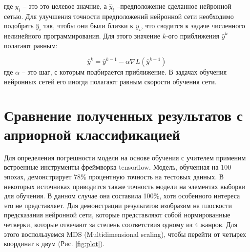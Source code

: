 где $y_i$ -- это это целевое значние, а $\hat y_i$ --предположение сделанное нейронной сетью.
Для улучшения точности предположений нейронной сети необходимо подобрать $\hat y_i$ так, чтобы они были близки к $y_i$, что сводится к задаче численного нелинейного программирования.
Для этого значение $k$-ого приближения $\hat y^k$ полагают равным:

\begin{equation}
	\hat y^k =\hat y^{k-1} - \alpha \nabla L(\hat y^{k-1})
\end{equation}
где $\alpha$ -- это шаг, с которым подбирается приближение. В задачах обучения нейронных сетей его иногда полагают равным скорости обучения сети.


\section{Сравнение полученных результатов с априорной классификацией}

Для определения погрешности модели на основе обучения с учителем применим встроенные инструменты фреймворка tensorflow.
Модель, обученная на 100 эпохах, демонстрирует 78\% процентную точность на тестовых данных. В некоторых источниках приводится также точность модели на элементах выборки для обучения. В данном случае она составила 100\%, хотя особенного интереса это не представляет.
Для демонстрации результатов изобразим на плоскости предсказания нейронной сети, которые представляют собой нормированные четверки, которые отвечают за степень соответствия одному из 4 жанров. Для этого
воспользуемся MDS (Multidimensional scaling), чтобы перейти от четырех координат к двум (Рис. \ref{fig:plot}).

